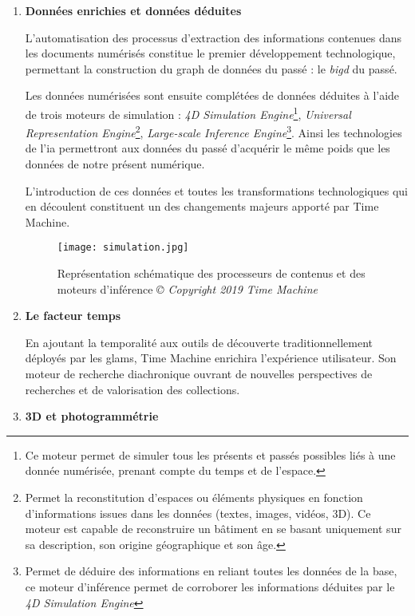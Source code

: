 \begin{enumerate}
\item \textbf{Données enrichies et données déduites}

L'automatisation des processus d'extraction des informations contenues dans les documents numérisés constitue le premier développement technologique, permettant la construction du \gls{graph} de données du passé : le \textit{\gls{bigd}} du passé.

Les données numérisées sont ensuite complétées de données déduites à l'aide de trois moteurs de simulation : \textit{4D Simulation Engine}\footnote{Ce moteur permet de simuler tous les présents et passés possibles liés à une donnée numérisée, prenant compte du temps et de l'espace.}, \textit{Universal Representation Engine}\footnote{Permet la reconstitution d'espaces ou éléments physiques en fonction d'informations issues dans les données (textes, images, vidéos, 3D). Ce moteur est capable de reconstruire un bâtiment en se basant uniquement sur sa description, son origine géographique et son âge.}, \textit{Large-scale Inference Engine}\footnote{Permet de déduire des informations en reliant toutes les données de la base, ce moteur d'inférence permet de corroborer les informations déduites par le \textit{4D Simulation Engine}}. Ainsi les technologies de l'\gls{ia} permettront aux données du passé d'acquérir le même poids que les données de notre présent numérique. 

L'introduction de ces données  et toutes les transformations technologiques qui en découlent constituent un des changements majeurs apporté par Time Machine.


\begin{figure}[H]%
\texttt{[image: simulation.jpg]}
\caption{Représentation schématique des processeurs de contenus et des moteurs d'inférence \textit{© Copyright 2019 Time Machine}}
\end{figure}
\newpage
\item \textbf{Le facteur temps}

En ajoutant la temporalité aux outils de découverte traditionnellement déployés par les \gls{glam}s, Time Machine enrichira l'expérience utilisateur. Son moteur de recherche diachronique ouvrant de nouvelles perspectives de recherches et de valorisation des collections.

\item \textbf{3D et photogrammétrie}


\end{enumerate}
